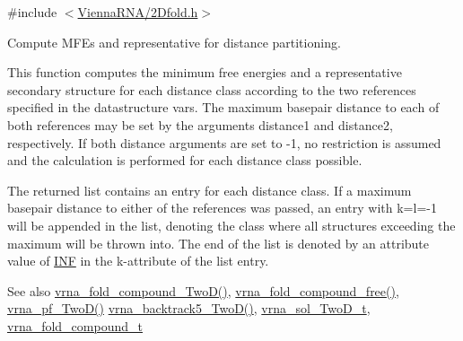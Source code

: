 {\ttfamily \#include $<$\mbox{\hyperlink{2_dfold_8h}{Vienna\+R\+N\+A/2\+Dfold.\+h}}$>$}



Compute M\+FE\textquotesingle{}s and representative for distance partitioning. 

This function computes the minimum free energies and a representative secondary structure for each distance class according to the two references specified in the datastructure \textquotesingle{}vars\textquotesingle{}. The maximum basepair distance to each of both references may be set by the arguments \textquotesingle{}distance1\textquotesingle{} and \textquotesingle{}distance2\textquotesingle{}, respectively. If both distance arguments are set to \textquotesingle{}-\/1\textquotesingle{}, no restriction is assumed and the calculation is performed for each distance class possible.

The returned list contains an entry for each distance class. If a maximum basepair distance to either of the references was passed, an entry with k=l=-\/1 will be appended in the list, denoting the class where all structures exceeding the maximum will be thrown into. The end of the list is denoted by an attribute value of \mbox{\hyperlink{energy__const_8h_a12c2040f25d8e3a7b9e1c2024c618cb6}{I\+NF}} in the k-\/attribute of the list entry.

\begin{DoxySeeAlso}{See also}
\mbox{\hyperlink{group__fold__compound_ga9d24b196753b4f9f03774f11661510f5}{vrna\+\_\+fold\+\_\+compound\+\_\+\+Two\+D()}}, \mbox{\hyperlink{group__fold__compound_gadded6039d63f5d6509836e20321534ad}{vrna\+\_\+fold\+\_\+compound\+\_\+free()}}, \mbox{\hyperlink{group__kl__neighborhood__pf_ga0bc3427689bd09da09b8b3094a27f836}{vrna\+\_\+pf\+\_\+\+Two\+D()}} \mbox{\hyperlink{group__kl__neighborhood__mfe_ga15a96fc96f4f4c2e01a11b3e17d1ef43}{vrna\+\_\+backtrack5\+\_\+\+Two\+D()}}, \mbox{\hyperlink{group__kl__neighborhood__mfe_structvrna__sol___two_d__t}{vrna\+\_\+sol\+\_\+\+Two\+D\+\_\+t}}, \mbox{\hyperlink{group__fold__compound_ga1b0cef17fd40466cef5968eaeeff6166}{vrna\+\_\+fold\+\_\+compound\+\_\+t}}
\end{DoxySeeAlso}

